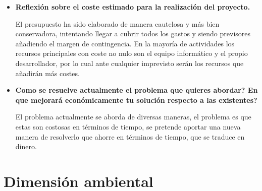 \begin{itemize}
 \item \textbf{Reflexión sobre el coste estimado para la realización del proyecto.}\newline
 
    El presupuesto ha sido elaborado de manera cautelosa y más bien conservadora, intentando llegar a cubrir todos los gastos y siendo previsores añadiendo el margen de contingencia. En la mayoría de actividades los recursos principales con coste no nulo son el equipo informático y el propio desarrollador, por lo cual ante cualquier imprevisto serán los recursos que añadirán más costes.

 \item \textbf{Como se resuelve actualmente el problema que quieres abordar? En que mejorará económicamente tu solución respecto a las existentes?}\newline
 
 El problema actualmente se aborda de diversas maneras, el problema es que estas son costosas en términos de tiempo, se pretende aportar una nueva manera de resolverlo que ahorre en términos de tiempo, que se traduce en dinero.
\end{itemize}

\section{Dimensión ambiental}

